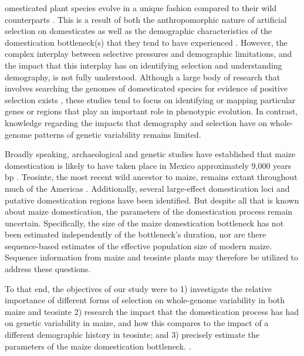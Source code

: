 \documentclass{pnastwo}
\begin{document}
\begin{article}
\DIFaddend {}omesticated plant species evolve in a unique fashion
compared to their wild counterparts \cite{doebley2006}. This
is a result of both the anthropomorphic nature of artificial selection on
domesticates \cite{purugganan2009} as well as the demographic characteristics of the domestication
bottleneck(s) that they tend to have experienced
\cite{ross2007}. However, the
complex interplay between selective pressures and demographic
limitations, and the impact that this interplay has on identifying
selection and understanding demography, is not fully understood. Although a large body of
research that involves searching the genomes of domesticated species for evidence
of positive selection exists \cite{hufford2012, he2011, vigouroux2002, chapman2008}, these studies tend to focus on
identifying or mapping particular genes or regions that play an
important role in phenotypic evolution. In contrast, knowledge regarding the impacts that demography and
selection have on whole-genome patterns of genetic variability remains limited.


\DIFdelbegin {}\DIFdelend Broadly speaking, archaeological and genetic studies have
established that maize domestication is likely to have taken place in
 Mexico approximately 9,000 years bp
\cite{smith1995,matsuoka2002}. Teosinte, the most
recent wild ancestor to maize, remains extant throughout much of the
Americas \cite{wilkes1967}. Additionally, several large-effect
domestication loci \cite{doebley1995, wills2013, wang2015} and putative domestication
regions \cite{hufford2012} have been identified. But despite all that is
known about maize domestication, the parameters of the
domestication process remain uncertain. Specifically, the size of the
maize domestication bottleneck has not been estimated independently of
the bottleneck's duration, nor are there sequence-based estimates of the effective
population size of modern maize. Sequence information from maize and
teosinte plants may therefore be utilized to address these questions.

To that end, the objectives of our study were to 1) investigate the
relative importance of different forms of selection on whole-genome
variability in both maize and teosinte 2) research the impact that the
domestication process has had on genetic variability in maize, and how
this compares to the impact of a different demographic history in
teosinte; and 3) precisely estimate the parameters of the
maize domestication bottleneck.  \cite{chia2012}.


\end{article}
\end{document}
